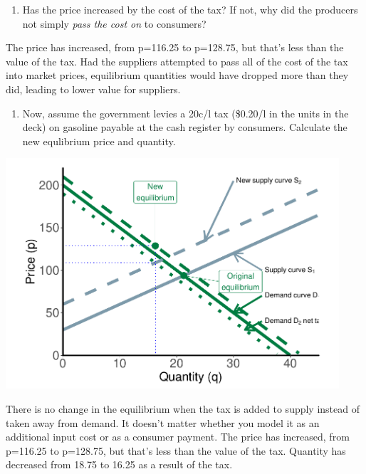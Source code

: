 \documentclass[11pt,]{article}
\providecommand{\tightlist}{%
  \setlength{\itemsep}{0pt}\setlength{\parskip}{0pt}}
\begin{document}
\begin{enumerate}
\def\labelenumi{\alph{enumi})}
\setcounter{enumi}{3}
\tightlist
\item
  Has the price increased by the cost of the tax? If not, why did the
  producers not simply \textit{pass the cost on} to consumers?
\end{enumerate}

The price has increased, from p=116.25 to p=128.75, but that's less than
the value of the tax. Had the suppliers attempted to pass all of the
cost of the tax into market prices, equilibrium quantities would have
dropped more than they did, leading to lower value for suppliers.

\begin{enumerate}
\def\labelenumi{\alph{enumi})}
\setcounter{enumi}{4}
\tightlist
\item
  Now, assume the government levies a 20c/l tax (\$0.20/l in the units
  in the deck) on gasoline payable at the cash register by consumers.
  Calculate the new equlibrium price and quantity.
\end{enumerate}

\begin{center}\includegraphics[width=468px]{week_3_problems_soln_files/figure-latex/q_3c_graphs-1} \end{center}

There is no change in the equilibrium when the tax is added to supply
instead of taken away from demand. It doesn't matter whether you model
it as an additional input cost or as a consumer payment. The price has
increased, from p=116.25 to p=128.75, but that's less than the value of
the tax. Quantity has decreased from 18.75 to 16.25 as a result of the
tax.
\end{document}

